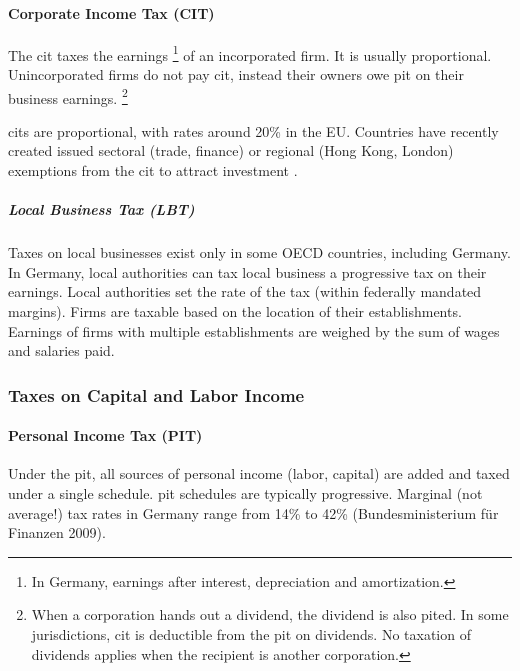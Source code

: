 \paragraph{Corporate Income Tax (CIT)}
	\label{sec:CIT}
The  \gls{cit} taxes the earnings
\footnote{
	In Germany, earnings after interest, depreciation and amortization.
}
of an incorporated firm.
It is usually proportional.
Unincorporated firms do not pay \gls{cit}, instead their owners owe \gls{pit} on their business earnings.
\footnote{
	When a corporation hands out a dividend, the dividend is also \gls{pit}ed.
	In some jurisdictions, \gls{cit} is deductible from the \gls{pit} on dividends.
	No taxation of dividends applies when the recipient is another corporation.
}

\glspl{cit} are proportional, with rates around 20\% in the EU.
Countries have recently created issued sectoral (trade, finance) or regional (Hong Kong, London) exemptions from the \gls{cit} to attract investment \citep{Genschel2009,Ganghof2007,Genschel2005}.

\subparagraph{Local Business Tax (LBT)}
	\label{sec:LBT}
Taxes on local businesses exist only in some OECD countries, including Germany.
In Germany, local authorities can tax local business a progressive tax on their earnings.
Local authorities set the rate of the tax (within federally mandated margins).
Firms are taxable based on the location of their establishments.
Earnings of firms with multiple establishments are weighed by the sum of wages and salaries paid.

\subsubsection{Taxes on Capital and Labor Income}

\paragraph{Personal Income Tax (PIT)}
	\label{sec:PIT}
Under the  \gls{pit}, all sources of personal income (labor, capital) are added and taxed under a single schedule.
\gls{pit} schedules are typically progressive.
Marginal (not average!) tax rates in Germany range from 14\% to 42\% (Bundesministerium für Finanzen 2009).


